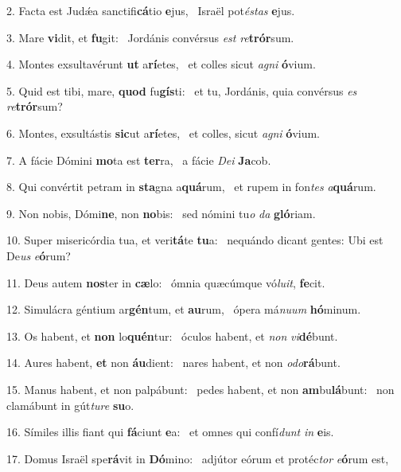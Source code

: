 2. Facta est Judǽa sanctifi\textbf{cá}tio \textbf{e}jus, \ast\  Israël pot\textit{és}\textit{tas} \textbf{e}jus.\

3. Mare \textbf{vi}dit, et \textbf{fu}git: \ast\  Jordánis convérsus \textit{est} \textit{re}\textbf{trór}sum.\

4. Montes exsultavérunt \textbf{ut} a\textbf{rí}etes, \ast\  et colles sicut \textit{a}\textit{gni} \textbf{ó}vium.\

5. Quid est tibi, mare, \textbf{quod} fu\textbf{gís}ti: \ast\  et tu, Jordánis, quia convérsus \textit{es} \textit{re}\textbf{trór}sum?\

6. Montes, exsultástis \textbf{sic}ut a\textbf{rí}etes, \ast\  et colles, sicut \textit{a}\textit{gni} \textbf{ó}vium.\

7. A fácie Dómini \textbf{mo}ta est \textbf{ter}ra, \ast\  a fácie \textit{De}\textit{i} \textbf{Ja}cob.\

8. Qui convértit petram in \textbf{sta}gna a\textbf{quá}rum, \ast\  et rupem in fon\textit{tes} \textit{a}\textbf{quá}rum.\

9. Non nobis, Dómi\textbf{ne}, non \textbf{no}bis: \ast\  sed nómini tu\textit{o} \textit{da} \textbf{gló}riam.\

10. Super misericórdia tua, et veri\textbf{tá}te \textbf{tu}a: \ast\  nequándo dicant gentes: Ubi est De\textit{us} \textit{e}\textbf{ó}rum?\

11. Deus autem \textbf{nos}ter in \textbf{cæ}lo: \ast\  ómnia quæcúmque vó\textit{lu}\textit{it}, \textbf{fe}cit.\

12. Simulácra géntium ar\textbf{gén}tum, et \textbf{au}rum, \ast\  ópera má\textit{nu}\textit{um} \textbf{hó}minum.\

13. Os habent, et \textbf{non} lo\textbf{quén}tur: \ast\  óculos habent, et \textit{non} \textit{vi}\textbf{dé}bunt.\

14. Aures habent, \textbf{et} non \textbf{áu}dient: \ast\  nares habent, et non \textit{o}\textit{do}\textbf{rá}bunt.\

15. Manus habent, et non palpábunt: \dag\  pedes habent, et non \textbf{am}bu\textbf{lá}bunt: \ast\  non clamábunt in gút\textit{tu}\textit{re} \textbf{su}o.\

16. Símiles illis fiant qui \textbf{fá}ciunt \textbf{e}a: \ast\  et omnes qui confí\textit{dunt} \textit{in} \textbf{e}is.\

17. Domus Israël spe\textbf{rá}vit in \textbf{Dó}mino: \ast\  adjútor eórum et protéc\textit{tor} \textit{e}\textbf{ó}rum est,\

